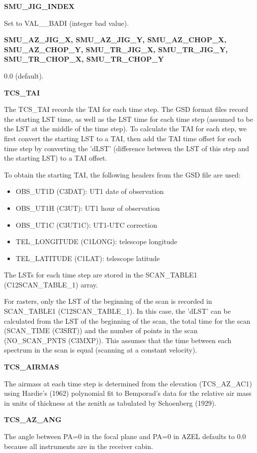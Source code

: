 \documentclass[twoside,11pt,nolof]{starlink}
\providecommand{\telLongitude}{TEL\_LONGITUDE (C1LONG)}
\providecommand{\telLatitude}{TEL\_LATITUDE (C1LAT)}
\providecommand{\obsUTd}{OBS\_UT1D (C3DAT)}
\providecommand{\obsUTh}{OBS\_UT1H (C3UT)}
\providecommand{\obsUTC}{OBS\_UT1C (C3UT1C)}
\providecommand{\scanTime}{SCAN\_TIME (C3SRT)}
\providecommand{\nScanPts}{NO\_SCAN\_PNTS (C3MXP)}
\providecommand{\scanTableA}{SCAN\_TABLE1 (C12SCAN\_TABLE\_1)}
\begin{document}
\textbf{SMU\_JIG\_INDEX}

Set to VAL\_\_BADI (integer bad value).

\textbf{SMU\_AZ\_JIG\_X, SMU\_AZ\_JIG\_Y, SMU\_AZ\_CHOP\_X, SMU\_AZ\_CHOP\_Y, SMU\_TR\_JIG\_X, SMU\_TR\_JIG\_Y, SMU\_TR\_CHOP\_X, SMU\_TR\_CHOP\_Y}

0.0 (default).

\textbf{TCS\_TAI}

The TCS\_TAI records the TAI for each time step.  The GSD format files record the starting LST time, as well as the LST time for each time step (assumed to be the LST at the middle of the time step).  To calculate the TAI for each step, we first convert the starting LST to a TAI, then add the TAI time offset for each time step by converting the 'dLST' (difference between the LST of this step and the starting LST) to a TAI offset.

To obtain the starting TAI, the following headers from the GSD file are used:

\begin{itemize}
\item \obsUTd: UT1 date of observation
\item \obsUTh: UT1 hour of observation
\item \obsUTC: UT1-UTC correction
\item \telLongitude: telescope longitude
\item \telLatitude: telescope latitude
\end{itemize}

The LSTs for each time step are stored in the \scanTableA{} array.

For rasters, only the LST of the beginning of the scan is recorded in \scanTableA{}.  In this case, the 'dLST' can be calculated from the LST of the beginning of the scan, the total time for the scan (\scanTime{}) and the number of points in the scan (\nScanPts{}).  This assumes that the time between each spectrum in the scan is equal (scanning at a constant velocity).

\textbf{TCS\_AIRMAS}

The airmass at each time step is determined from the elevation (TCS\_AZ\_AC1) using Hardie's (1962) polynomial fit to Bemporad's data for the relative air mass in units of thickness at the zenith as tabulated by Schoenberg (1929).

\textbf{TCS\_AZ\_ANG}

The angle between PA=0 in the focal plane and PA=0 in AZEL defaults to 0.0 because all instruments are in the receiver cabin.
\end{document}
